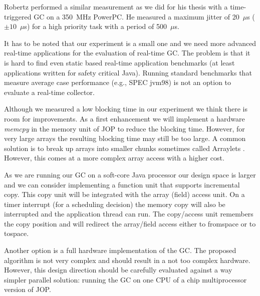 Robertz performed a similar measurement as we did for his thesis
\cite{gc:robertz:thesis} with a time-triggered GC on a 350~MHz
PowerPC. He measured a maximum jitter of 20~$\mu$s ($\pm10$~$\mu$s)
for a high priority task with a period of 500~$\mu$s.

It has to be noted that our experiment is a small one and we need
more advanced real-time applications for the evaluation of real-time
GC. The problem is that it is hard to find even static based
real-time application benchmarks (at least applications written for
safety critical Java). Running standard benchmarks that measure
average case performance (e.g., SPEC jvm98) is not an option to
evaluate a real-time collector.



Although we measured a low blocking time in our experiment we think
there is room for improvements. As a first enhancement we will
implement a hardware \emph{memcpy} in the memory unit of JOP to
reduce the blocking time. However, for very large arrays the
resulting blocking time may still be too large. A common solution is
to break up arrays into smaller chunks sometimes called Arraylets
\cite{gc:bacon03}. However, this comes at a more complex array
access with a higher cost.

As we are running our GC on a soft-core Java processor our design
space is larger and we can consider implementing a function unit
that supports incremental copy. This copy unit will be integrated
with the array (field) access unit. On a timer interrupt (for a
scheduling decision) the memory copy will also be interrupted and
the application thread can run. The copy/access unit remembers the
copy position and will redirect the array/field access either to
fromspace or to tospace.

Another option is a full hardware implementation of the GC. The
proposed algorithm is not very complex and should result in a not
too complex hardware. However, this design direction should be
carefully evaluated against a way simpler parallel solution: running
the GC on one CPU of a chip multiprocessor version of JOP.

